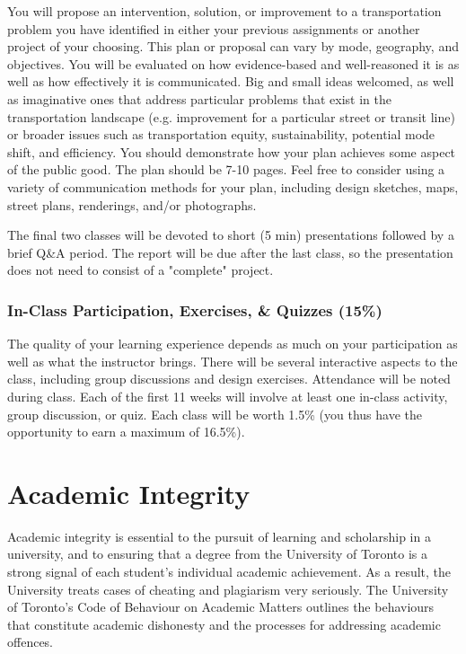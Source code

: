 \documentclass[11pt]{article}
\begin{document}
	You will propose an intervention, solution, or
	improvement to a transportation problem you have identified in either your previous assignments or another project of your choosing. This plan or proposal can vary by mode, geography, and objectives. You will be evaluated on how evidence-based and well-reasoned it is as well as how effectively it is communicated. Big and small ideas welcomed, as well as imaginative ones that address particular problems that exist in the transportation landscape (e.g. improvement for a particular street or transit line) or broader issues such as transportation equity, sustainability, potential mode shift, and efficiency. You should demonstrate how your plan achieves some aspect of the public good. The plan should be 7-10	pages. Feel free to consider using a variety of communication methods for your plan, including design sketches, maps, street plans, renderings, and/or photographs.
	
	The final two classes will be devoted to short (5 min) presentations followed by a brief Q\&A period. The report will be due after the last class, so the presentation does not need to consist of a "complete" project.
	
	
	
	
	\subsubsection*{In-Class Participation, Exercises, \& Quizzes (15\%)}
	
	The quality of your learning experience depends as much on your participation as well as what the instructor brings. There will be several interactive aspects to the class, including group discussions and design exercises. Attendance will be noted during class. Each of the first 11 weeks will involve at least one in-class activity, group discussion, or quiz. Each class will be worth 1.5\% (you thus have the opportunity to earn a maximum of 16.5\%).
	
	
	
	
	
	\section*{Academic Integrity}
	
	Academic integrity is essential to the pursuit of learning and scholarship in a university, and to ensuring that a degree from the University of Toronto is a strong signal of each student’s individual academic achievement. As a result, the University treats cases of cheating and plagiarism very seriously. The University of Toronto's Code of Behaviour on Academic Matters outlines the behaviours that constitute academic dishonesty and the processes for addressing academic offences. 
	
\end{document}
